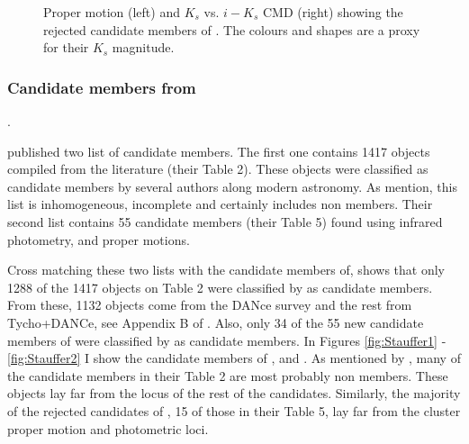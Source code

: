 \begin{figure}[htbp]
\begin{center}
\caption{Proper motion (left) and $K_s$ vs. $i-K_s$ CMD (right) showing the rejected candidate members of \citet{Bouy2015}. The colours and shapes are a proxy for their $K_s$ magnitude.}
\label{figure:rejectedsCOLORS}
\end{center}
\end{figure}
\subsubsection{Candidate members from \citet{Stauffer2007}}.

\citet{Stauffer2007} published two list of candidate members. The first one contains 1417 objects compiled from the literature (their Table 2). These objects were classified as candidate members by several authors along modern astronomy. As \citet{Stauffer2007} mention, this list is inhomogeneous, incomplete and certainly includes non members. Their second list contains 55 candidate members  (their Table 5) found using infrared photometry, and proper motions.

Cross matching these two lists with the candidate members of\citet{Bouy2015}, shows that only 1288 of the 1417 objects on \citet{Stauffer2007} Table 2 were classified by \citet{Bouy2015} as candidate members. From these, 1132 objects come from the DANce survey and the rest from Tycho+DANCe, see Appendix B of \citet{Bouy2015}. Also, only 34 of the 55 new candidate members of  \citet{Stauffer2007} were classified by \citet{Bouy2015} as candidate members. In Figures \ref{fig:Stauffer1} - \ref{fig:Stauffer2} I show the candidate members of \citet{Stauffer2007}, and \citet{Bouy2015}. As mentioned by \citet{Stauffer2007}, many of the candidate members in their Table 2 are most probably non members. These objects lay far from the locus of the rest of the candidates. Similarly, the majority of the rejected candidates of \citet{Stauffer2007}, 15 of those in their Table 5, lay far from the cluster proper motion and photometric loci.


